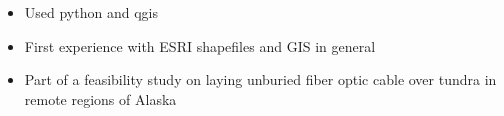 \small
\begin{itemize}
     \item Used python and qgis
     \item First experience with ESRI shapefiles and GIS in general
     \item Part of a feasibility study on laying unburied fiber optic cable over tundra in remote regions of Alaska
\end{itemize}
\normalsize
